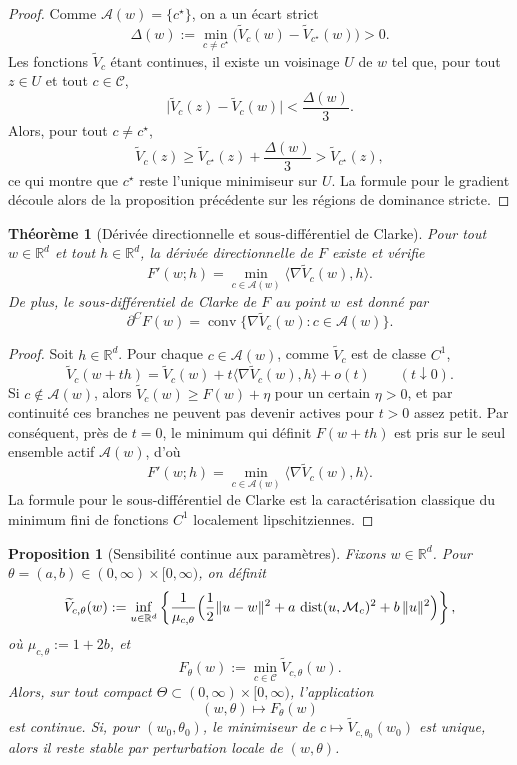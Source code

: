 \documentclass[11pt,a4paper]{article}
\newtheorem{proposition}{Proposition}[section]
\newtheorem{theorem}{Théorème}[section]
\DeclareMathOperator{\dist}{dist}
\newcommand{\R}{\mathbb R}
\newcommand{\Mcal}{\mathcal M}
\newcommand{\Ccal}{\mathcal C}
\begin{document}
\begin{proof}
Comme \(\mathcal A(w)=\{c^\star\}\), on a un écart strict
\[
\Delta(w):=\min_{c\neq c^\star}\bigl(\widetilde V_c(w)-\widetilde V_{c^\star}(w)\bigr)>0.
\]
Les fonctions \(\widetilde V_c\) étant continues, il existe un voisinage \(U\) de \(w\) tel que, pour tout \(z\in U\) et tout \(c\in\Ccal\),
\[
\bigl|\widetilde V_c(z)-\widetilde V_c(w)\bigr|<\frac{\Delta(w)}{3}.
\]
Alors, pour tout \(c\neq c^\star\),
\[
\widetilde V_c(z)\ge \widetilde V_{c^\star}(z)+\frac{\Delta(w)}{3}> \widetilde V_{c^\star}(z),
\]
ce qui montre que \(c^\star\) reste l'unique minimiseur sur \(U\).
La formule pour le gradient découle alors de la proposition précédente sur les régions de dominance stricte.
\end{proof}

\begin{theorem}[Dérivée directionnelle et sous-différentiel de Clarke]
Pour tout \(w\in\R^d\) et tout \(h\in\R^d\), la dérivée directionnelle de \(F\) existe et vérifie
\[
F'(w;h)=\min_{c\in\mathcal A(w)}\langle \nabla \widetilde V_c(w),h\rangle.
\]
De plus, le sous-différentiel de Clarke de \(F\) au point \(w\) est donné par
\[
\partial^C F(w)
=
\operatorname{conv}\bigl\{\nabla \widetilde V_c(w): c\in\mathcal A(w)\bigr\}.
\]
\end{theorem}

\begin{proof}
Soit \(h\in\R^d\). Pour chaque \(c\in\mathcal A(w)\), comme \(\widetilde V_c\) est de classe \(C^1\),
\[
\widetilde V_c(w+th)
=
\widetilde V_c(w)+t\langle \nabla \widetilde V_c(w),h\rangle+o(t)
\qquad (t\downarrow 0).
\]
Si \(c\notin\mathcal A(w)\), alors \(\widetilde V_c(w)\ge F(w)+\eta\) pour un certain \(\eta>0\), et par continuité ces branches ne peuvent pas devenir actives pour \(t>0\) assez petit.
Par conséquent, près de \(t=0\), le minimum qui définit \(F(w+th)\) est pris sur le seul ensemble actif \(\mathcal A(w)\), d'où
\[
F'(w;h)=\min_{c\in\mathcal A(w)}\langle \nabla \widetilde V_c(w),h\rangle.
\]
La formule pour le sous-différentiel de Clarke est la caractérisation classique du minimum fini de fonctions \(C^1\) localement lipschitziennes.
\end{proof}

\begin{proposition}[Sensibilité continue aux paramètres]
Fixons \(w\in\R^d\). Pour \(\theta=(a,b)\in(0,\infty)\times[0,\infty)\), on définit
\[
\widetilde V_{c,\theta}(w):=\inf_{u\in\R^d}
\left\{
\frac{1}{\mu_{c,\theta}}
\Bigl(\frac12\|u-w\|^2+a\,\dist(u,\Mcal_c)^2+b\,\|u\|^2\Bigr)
\right\},
\]
où \(\mu_{c,\theta}:=1+2b\), et
\[
F_\theta(w):=\min_{c\in\Ccal}\widetilde V_{c,\theta}(w).
\]
Alors, sur tout compact \(\Theta\subset(0,\infty)\times[0,\infty)\), l'application
\[
(w,\theta)\longmapsto F_\theta(w)
\]
est continue. Si, pour \((w_0,\theta_0)\), le minimiseur de \(c\mapsto \widetilde V_{c,\theta_0}(w_0)\) est unique, alors il reste stable par perturbation locale de \((w,\theta)\).
\end{proposition}
\end{document}
